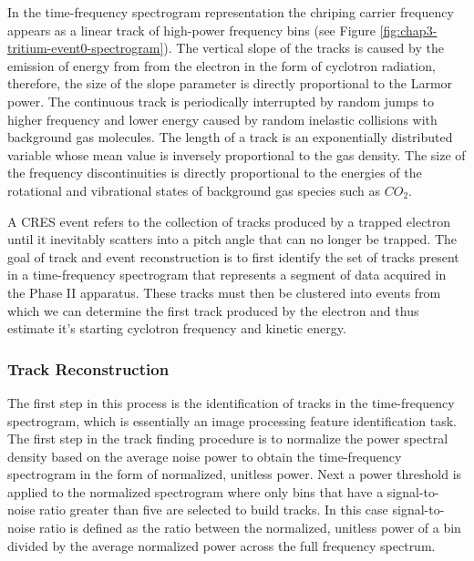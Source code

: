 In the time-frequency spectrogram representation the chriping carrier frequency appears as a linear track of high-power frequency bins (see Figure \ref{fig:chap3-tritium-event0-spectrogram}). The vertical slope of the tracks is caused by the emission of energy from from the electron in the form of cyclotron radiation, therefore, the size of the slope parameter is directly proportional to the Larmor power. The continuous track is periodically interrupted by random jumps to higher frequency and lower energy caused by random inelastic collisions with background gas molecules. The length of a track is an exponentially distributed variable whose mean value is inversely proportional to the gas density. The size of the frequency discontinuities is directly proportional to the energies of the rotational and vibrational states of background gas species such as $CO_2$. 

A CRES event refers to the collection of tracks produced by a trapped electron until it inevitably scatters into a pitch angle that can no longer be trapped. The goal of track and event reconstruction is to first identify the set of tracks present in a time-frequency spectrogram that represents a segment of data acquired in the Phase II apparatus. These tracks must then be clustered into events from which we can determine the first track produced by the electron and thus estimate it's starting cyclotron frequency and kinetic energy. 

\subsubsection*{Track Reconstruction}

The first step in this process is the identification of tracks in the time-frequency spectrogram, which is essentially an image processing feature identification task. The first step in the track finding procedure is to normalize the power spectral density based on the average noise power to obtain the time-frequency spectrogram in the form of normalized, unitless power. Next a power threshold is applied to the normalized spectrogram where only bins that have a signal-to-noise ratio greater than five are selected to build tracks. In this case signal-to-noise ratio is defined as the ratio between the normalized, unitless power of a bin divided by the average normalized power across the full frequency spectrum.

